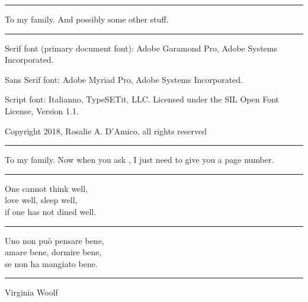 	\NewDocumentCommand \MyDedication{}
	{\hrule\vspace{5pt} To my family. And possibly some other stuff. \vspace{5pt}\hrule}

	\NewDocumentCommand \DedicationVerso{}{}

\else
	\NewDocumentCommand \MyTitlePage{} {\noindent \MakeTitlePage{} \clearpage}

	\NewDocumentCommand \ColophonFonts{}
	{
		Serif font (primary document font):
		Adobe Garamond Pro, \Copyright{} Adobe Systems Incorporated.\par
		Sans Serif font:
		Adobe Myriad Pro, \Copyright{} Adobe Systems Incorporated.\par
		Script font: Italianno, \Copyright{} TypeSETit, LLC. Licensed under the SIL Open Font License, Version 1.1.\par
	}

	\NewDocumentCommand \CopyrightInfo{}
	{Copyright \Copyright{} 2018, Rosalie A. D'Amico, all rights reserved}

	\NewDocumentCommand \MyDedication{}
	{\hrule\vspace{5pt}
		To my family.  Now when you ask , I just need to give you a page number.%
		\vspace{5pt}\hrule}

	\NewDocumentCommand \DedicationVerso{}
	{
		\begin{center}
			{\FontChapterTitle
				One cannot think well, \\
				love well, sleep well, \\
				if one has not dined well.\\
				\vspace{5pt}
				\hrule
				\vspace{5pt}
				Uno non pu\`o pensare bene, \\
				amare bene, dormire bene, \\
				se  non ha mangiato bene. \\
				\vspace{5pt}
				\hrule
				\vspace{5pt}
				Virginia Woolf
			}
		\end{center}
	}
\fi

\graphicspath{{images/}{../images/}} %
\usepackage[skip=2pt, labelformat=empty, font={rm,it}]{caption} %
\captionsetup{justification=centering} %

